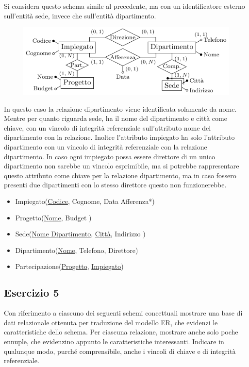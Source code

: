 \documentclass{article}
\numberwithin{equation}{subsection}
\begin{document}
Si considera questo schema simile al precedente, ma con un identificatore esterno sull'entità sede, invece che sull'entità dipartimento. 

\begin{figure}[H]%
    \centering%
    \includegraphics[scale=1.25]{schema_azienda_25-11-24_2.pdf}%
\end{figure}

In questo caso la relazione dipartimento viene identificata solamente da nome. Mentre per quanto riguarda sede, ha il nome del dipartimento e 
città come chiave, con un vincolo di integrità referenziale sull'attributo nome del dipartimento con la relazione. Inoltre l'attributo impiegato 
ha solo l'attributo dipartimento con un vincolo di integrità referenziale con la relazione dipartimento. In caso ogni impiegato possa essere 
direttore di un unico dipartimento non sarebbe un vincolo esprimibile, ma si potrebbe rappresentare questo attributo come chiave per la 
relazione dipartimento, ma in caso fossero presenti due dipartimenti con lo stesso direttore questo non funzionerebbe. 

\begin{itemize}
    \item Impiegato(\underline{Codice}, Cognome, Data Afferenza*)
    \item Progetto(\underline{Nome}, Budget )
    \item Sede(\underline{Nome Dipartimento}, \underline{Città}, Indirizzo )
    \item Dipartimento(\underline{Nome}, Telefono, Direttore)
    \item Partecipazione(\underline{Progetto}, \underline{Impiegato})
\end{itemize}

\subsection{Esercizio 5}

Con riferimento a ciascuno dei seguenti schemi concettuali mostrare una base di dati relazionale ottenuta per traduzione del 
modello ER, che evidenzi le caratteristiche dello schema. Per ciascuna relazione, mostrare anche solo poche ennuple, che 
evidenzino appunto le caratteristiche interessanti. Indicare in qualunque modo, purché comprensibile, 
anche i vincoli di chiave e di integrità referenziale. 
\end{document}
